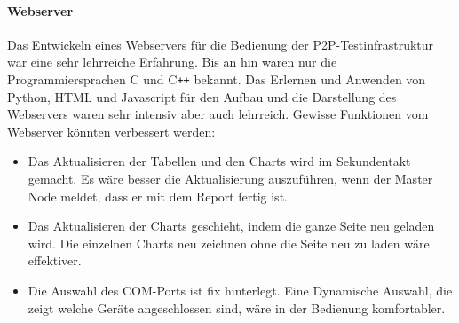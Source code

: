 \paragraph{Webserver}
Das Entwickeln eines Webservers für die Bedienung der P2P-Testinfrastruktur war eine sehr lehrreiche Erfahrung. Bis an hin waren nur die Programmiersprachen C und C\texttt{++} bekannt. Das Erlernen und Anwenden von Python, HTML und Javascript für den Aufbau und die Darstellung des Webservers waren sehr intensiv aber auch lehrreich. Gewisse Funktionen vom Webserver könnten verbessert werden:

\begin{itemize}
	\item Das Aktualisieren der Tabellen und den Charts wird im Sekundentakt gemacht. Es wäre besser die Aktualisierung auszuführen, wenn der Master Node meldet, dass er mit dem Report fertig ist.
	\item Das Aktualisieren der Charts geschieht, indem die ganze Seite neu geladen wird. Die einzelnen Charts neu zeichnen ohne die Seite neu zu laden wäre effektiver.
	\item Die Auswahl des COM-Ports ist fix hinterlegt. Eine Dynamische Auswahl, die zeigt welche Geräte angeschlossen sind, wäre in der Bedienung komfortabler.
\end{itemize}


